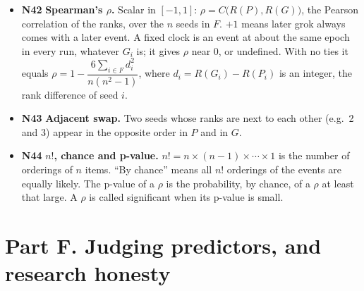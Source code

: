 \documentclass[11pt,a4paper,oneside,openany]{report}
\newcommand{\gl}[1]{\textbf{#1}}   %
\newenvironment{glist}{\begin{itemize}\setlength{\itemsep}{2pt}\setlength{\parskip}{1pt}}{\end{itemize}}
\begin{document}
\begin{glist}
$C(X, Y) = \dfrac{\sum (X_i - \bar X)(Y_i - \bar Y)}{\sqrt{\sum (X_i - \bar X)^2 \, \sum (Y_i - \bar Y)^2}}$,
a scalar in $[-1, 1]$. It measures how close the points are to a straight line; $+1$ means a rising line. It is undefined if either list is constant (the denominator is 0); code then typically returns NaN, ``not a number''.
\item[\gl{N42}] \textbf{Spearman's $\rho$.} Scalar in $[-1, 1]$: $\rho = C\big(R(P), R(G)\big)$, the Pearson correlation of the ranks, over the $n$ seeds in $F$. $+1$ means later grok always comes with a later event. A fixed clock is an event at about the same epoch in every run, whatever $G_i$ is; it gives $\rho$ near 0, or undefined. With no ties it equals $\rho = 1 - \dfrac{6 \sum_{i \in F} d_i^2}{n(n^2 - 1)}$, where $d_i = R(G_i) - R(P_i)$ is an integer, the rank difference of seed $i$.
\item[\gl{N43}] \textbf{Adjacent swap.} Two seeds whose ranks are next to each other (e.g.\ 2 and 3) appear in the opposite order in $P$ and in $G$.
\item[\gl{N44}] \textbf{$n!$, chance and p-value.} $n! = n \times (n-1) \times \cdots \times 1$ is the number of orderings of $n$ items. ``By chance'' means all $n!$ orderings of the events are equally likely. The p-value of a $\rho$ is the probability, by chance, of a $\rho$ at least that large. A $\rho$ is called significant when its p-value is small.
\end{glist}

\section*{Part F. Judging predictors, and research honesty}
\end{document}

